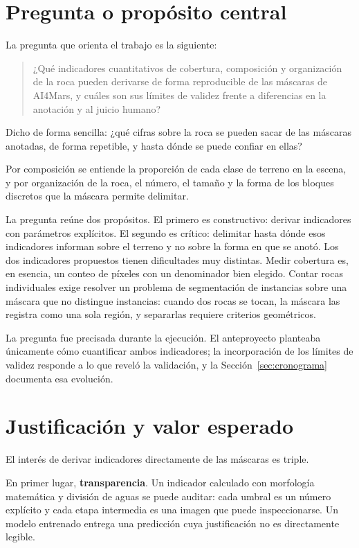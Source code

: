 \section{Pregunta o propósito central}

La pregunta que orienta el trabajo es la siguiente:

\begin{quote}
¿Qué indicadores cuantitativos de cobertura, composición y organización de la roca pueden
derivarse de forma reproducible de las máscaras de AI4Mars, y cuáles son sus límites de validez
frente a diferencias en la anotación y al juicio humano?
\end{quote}

Dicho de forma sencilla: ¿qué cifras sobre la roca se pueden sacar de las máscaras anotadas, de
forma repetible, y hasta dónde se puede confiar en ellas?

Por composición se entiende la proporción de cada clase de terreno en la escena, y por
organización de la roca, el número, el tamaño y la forma de los bloques discretos que la
máscara permite delimitar.

La pregunta reúne dos propósitos. El primero es constructivo: derivar indicadores con
parámetros explícitos. El segundo es crítico: delimitar hasta dónde esos indicadores informan
sobre el terreno y no sobre la forma en que se anotó. Los dos indicadores propuestos tienen
dificultades muy distintas. Medir cobertura es, en esencia, un conteo de píxeles con un
denominador bien elegido. Contar rocas individuales exige resolver un problema de segmentación
de instancias sobre una máscara que no distingue instancias: cuando dos rocas se tocan, la
máscara las registra como una sola región, y separarlas requiere criterios geométricos.

La pregunta fue precisada durante la ejecución. El anteproyecto planteaba únicamente cómo
cuantificar ambos indicadores; la incorporación de los límites de validez responde a lo que
reveló la validación, y la Sección~\ref{sec:cronograma} documenta esa evolución.

\section{Justificación y valor esperado}

El interés de derivar indicadores directamente de las máscaras es triple.

En primer lugar, \textbf{transparencia}. Un indicador calculado con morfología matemática y
división de aguas se puede auditar: cada umbral es un número explícito y cada etapa intermedia
es una imagen que puede inspeccionarse. Un modelo entrenado entrega una predicción cuya
justificación no es directamente legible.

